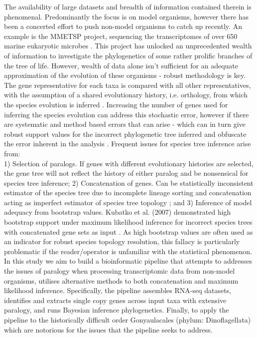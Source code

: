 \documentclass[12pt]{article}
\begin{document}
The availability of large datasets and breadth of information contained therein is phenomenal. 
Predominantly the focus is on model organisms, however there has been a concerted effort to push non-model organisms to catch up recently. 
An example is the MMETSP project, sequencing the transcriptomes of over 650 marine eukaryotic microbes \cite{keeling2014marine}. 
This project has unlocked an unprecedented wealth of information to investigate the phylogenetics of some rather prolific branches of the tree of life. 
However, wealth of data alone isn't sufficient for an adequate approximation of the evolution of these organisms - robust methodology is key. 
The gene representative for each taxa is compared with all other representatives, with the assumption of a shared evolutionary history, i.e. orthology, from which the species evolution is inferred \cite{maddison1997gene}. 
Increasing the number of genes used for inferring the species evolution can address this stochastic error, however if there are systematic and method based errors that can arise - which can in turn give robust support values for the incorrect phylogenetic tree inferred and obfuscate the error inherent in the analysis \cite{jeffroy2006phylogenomics,roch2015likelihood,kubatko2007inconsistency}. 
Frequent issues for species tree inference arise from:\\
1) Selection of paralogs. If genes with different evolutionary histories are selected, the gene tree will not reflect the history of either paralog and be nonsensical for species tree inference; 
2) Concatenation of genes. Can be statistically inconsistent estimator of the species tree due to incomplete lineage sorting and concatenation acting as imperfect estimator of species tree topology \cite{roch2015likelihood}; and 
3) Inference of model adequacy from bootstrap values. Kubatko et al. (2007) demonstrated high bootstrap support under maximum likelihood inference for incorrect species trees with concatenated gene sets as input \cite{kubatko2007inconsistency}. 
As high bootstrap values are often used as an indicator for robust species topology resolution, this fallacy is particularly problematic if the reader/operator is unfamiliar with the statistical phenomenon.\\
In this study we aim to build a bioinformatic pipeline that attempts to addresses the issues of paralogy when processing transcriptomic data from non-model organisms, utilises alternative methods to both concatenation and maximum likelihood inference. 
Specifically, the pipeline assembles RNA-seq datasets, identifies and extracts single copy genes across input taxa with extensive paralogy, and runs Bayesian inference phylogenetics. 
Finally, to apply the pipeline to the historically difficult order Gonyaulacales (phylum: Dinoflagellata) which are notorious for the issues that the pipeline seeks to address.\\
\end{document}
